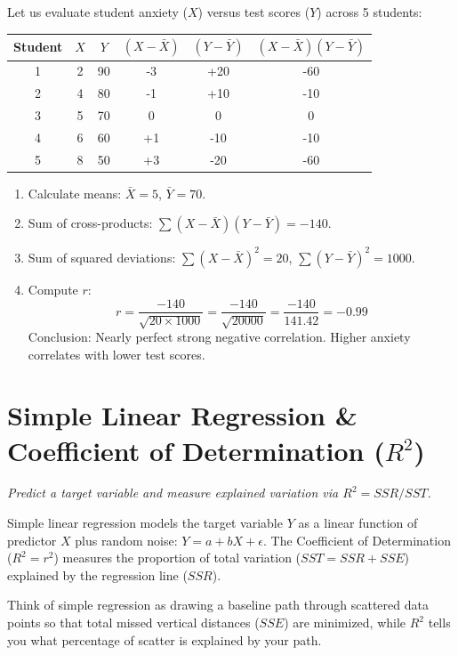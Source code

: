 \documentclass[10pt,a4paper]{article}
\newenvironment{intuition}{\begin{tcolorbox}}{\end{tcolorbox}}
\newenvironment{worked}{\begin{tcolorbox}}{\end{tcolorbox}}
\newenvironment{steps}{\begin{enumerate}[label=\textbf{Step \arabic*:},leftmargin=*]}{\end{enumerate}}
\newcommand{\secsub}[1]{\noindent\textit{\large #1}\vspace{0.8em}}
\begin{document}
\begin{worked}
Let us evaluate student anxiety ($X$) versus test scores ($Y$) across 5 students:
\begin{center}
\begin{tabular}{cccccc}
\toprule
Student & $X$ & $Y$ & $(X-\bar{X})$ & $(Y-\bar{Y})$ & $(X-\bar{X})(Y-\bar{Y})$ \\
\midrule
1 & 2 & 90 & -3 & +20 & -60 \\
2 & 4 & 80 & -1 & +10 & -10 \\
3 & 5 & 70 & 0 & 0 & 0 \\
4 & 6 & 60 & +1 & -10 & -10 \\
5 & 8 & 50 & +3 & -20 & -60 \\
\bottomrule
\end{tabular}
\end{center}
\begin{steps}
\item Calculate means: $\bar{X} = 5$, $\bar{Y} = 70$.
\item Sum of cross-products: $\sum (X-\bar{X})(Y-\bar{Y}) = -140$.
\item Sum of squared deviations: $\sum (X-\bar{X})^2 = 20$, $\sum (Y-\bar{Y})^2 = 1000$.
\item Compute $r$:
\begin{equation}
r = \frac{-140}{\sqrt{20 \times 1000}} = \frac{-140}{\sqrt{20000}} = \frac{-140}{141.42} = -0.99
\end{equation}
Conclusion: Nearly perfect strong negative correlation. Higher anxiety correlates with lower test scores.
\end{steps}
\end{worked}

\section{Simple Linear Regression \& Coefficient of Determination ($R^2$)}
\secsub{Predict a target variable and measure explained variation via $R^2 = SSR / SST$.}

Simple linear regression models the target variable $Y$ as a linear function of predictor $X$ plus random noise: $Y = a + bX + \epsilon$. The Coefficient of Determination ($R^2 = r^2$) measures the proportion of total variation ($SST = SSR + SSE$) explained by the regression line ($SSR$).

\begin{intuition}
Think of simple regression as drawing a baseline path through scattered data points so that total missed vertical distances ($SSE$) are minimized, while $R^2$ tells you what percentage of scatter is explained by your path.
\end{intuition}
\end{document}
